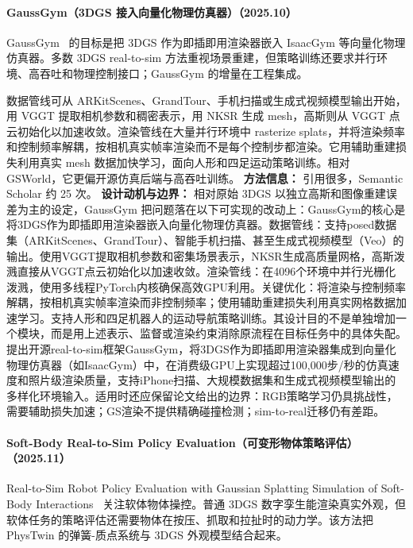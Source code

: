 \paragraph{GaussGym（3DGS 接入向量化物理仿真器）（2025.10）}
GaussGym~\cite{2510_15352} 的目标是把 3DGS 作为即插即用渲染器嵌入 IsaacGym 等向量化物理仿真器。多数 3DGS real-to-sim 方法重视场景重建，但策略训练还要求并行环境、高吞吐和物理控制接口；GaussGym 的增量在工程集成。

数据管线可从 ARKitScenes、GrandTour、手机扫描或生成式视频模型输出开始，用 VGGT 提取相机参数和稠密表示，用 NKSR 生成 mesh，高斯则从 VGGT 点云初始化以加速收敛。渲染管线在大量并行环境中 rasterize splats，并将渲染频率和控制频率解耦，按相机真实帧率渲染而不是每个控制步都渲染。它用辅助重建损失利用真实 mesh 数据加快学习，面向人形和四足运动策略训练。相对 GSWorld，它更偏开源仿真后端与高吞吐训练。
\textbf{方法信息：} 引用很多，Semantic Scholar 约 25 次。
\textbf{设计动机与边界：} 相对原始 3DGS 以独立高斯和图像重建误差为主的设定，GaussGym 把问题落在以下可实现的改动上：GaussGym的核心是将3DGS作为即插即用渲染器嵌入向量化物理仿真器。数据管线：支持posed数据集（ARKitScenes、GrandTour）、智能手机扫描、甚至生成式视频模型（Veo）的输出。使用VGGT提取相机参数和密集场景表示，NKSR生成高质量网格，高斯泼溅直接从VGGT点云初始化以加速收敛。渲染管线：在4096个环境中并行光栅化泼溅，使用多线程PyTorch内核确保高效GPU利用。关键优化：将渲染与控制频率解耦，按相机真实帧率渲染而非控制频率；使用辅助重建损失利用真实网格数据加速学习。支持人形和四足机器人的运动导航策略训练。其设计目的不是单独增加一个模块，而是用上述表示、监督或渲染约束消除原流程在目标任务中的具体失配。提出开源real-to-sim框架GaussGym，将3DGS作为即插即用渲染器集成到向量化物理仿真器（如IsaacGym）中，在消费级GPU上实现超过100,000步/秒的仿真速度和照片级渲染质量，支持iPhone扫描、大规模数据集和生成式视频模型输出的多样化环境输入。适用时还应保留论文给出的边界：RGB策略学习仍具挑战性，需要辅助损失加速；GS渲染不提供精确碰撞检测；sim-to-real迁移仍有差距。
\paragraph{Soft-Body Real-to-Sim Policy Evaluation（可变形物体策略评估）（2025.11）}
Real-to-Sim Robot Policy Evaluation with Gaussian Splatting Simulation of Soft-Body Interactions~\cite{2511_04665} 关注软体物体操控。普通 3DGS 数字孪生能渲染真实外观，但软体任务的策略评估还需要物体在按压、抓取和拉扯时的动力学。该方法把 PhysTwin 的弹簧-质点系统与 3DGS 外观模型结合起来。


